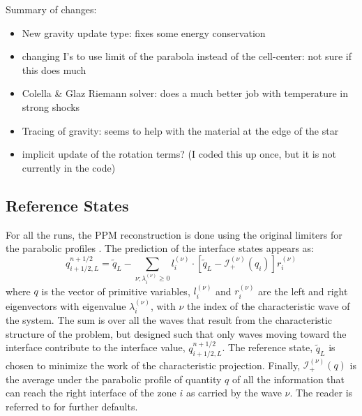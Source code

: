 \documentclass{emulateapj}
\begin{document}
Summary of changes:
\begin{itemize}
\item New gravity update type: fixes some energy conservation

\item changing I's to use limit of the parabola instead of the
  cell-center: not sure if this does much

\item Colella \& Glaz Riemann solver: does a much better job with
  temperature in strong shocks

\item Tracing of gravity: seems to help with the material at the edge
  of the star

\item implicit update of the rotation terms?  (I coded this up once, but
  it is not currently in the code)
\end{itemize}

\subsection{Reference States}

For all the runs, the PPM reconstruction is done using the original limiters for
the parabolic profiles \citep{ppm}.  The prediction of the interface
states appears as:
\begin{equation}
\label{eq:ppmstatel}
q_{i+1/2,L}^{n+1/2} = \tilde{q}_L -
   \sum_{\nu;\lambda_i^{(\nu)}\ge 0} l_i^{(\nu)} \cdot \left [
        \tilde{q}_L  - \mathcal{I}^{(\nu)}_+(q_i)
       \right ] r_i^{(\nu)}
\end{equation}
where $q$ is the vector of primitive variables, $l_i^{(\nu)}$ and
$r_i^{(\nu)}$ are the left and right eigenvectors with eigenvalue
$\lambda_i^{(\nu)}$, with $\nu$ the index of the characteristic wave of
the system.  The sum is over all the waves that result from the
characteristic structure of the problem, but designed such that only
waves moving toward the interface contribute to the interface value,
$q_{i+1/2,L}^{n+1/2}$.  The reference state, $\tilde{q}_L$ is
chosen to minimize the work of the characteristic projection.
Finally, $\mathcal{I}_+^{(\nu)}(q)$ is the
average under the parabolic profile of quantity $q$ of all the
information that can reach the right interface of the zone $i$ as
carried by the wave $\nu$.  The reader is referred to
\citet{ppmunsplit} for further defaults.
\end{document}
